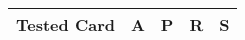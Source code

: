 \documentclass{article}
\begin{document}
\begin{table}[ht]

\centering

\begin{tabular}{c c c c c}

\hline

\textbf{Tested Card} & \textbf{A} & \textbf{P} & \textbf{R} & \textbf{S} \\

\hline


\hline


\hline


\hline


\hline

\end{tabular}

\end{table}
\end{document}
